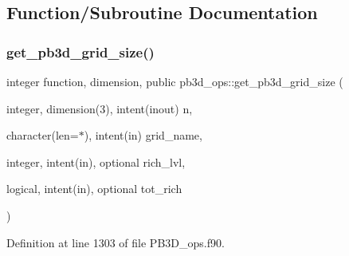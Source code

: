 \subsection{Function/\+Subroutine Documentation}
\mbox{\label{namespacepb3d__ops_a0bd4c4c24d7cbd1494b31ea993946433}} 
\subsubsection{\texorpdfstring{get\+\_\+pb3d\+\_\+grid\+\_\+size()}{get\_pb3d\_grid\_size()}}
{\footnotesize\ttfamily integer function, dimension, public pb3d\+\_\+ops\+::get\+\_\+pb3d\+\_\+grid\+\_\+size (\begin{DoxyParamCaption}\item[{integer, dimension(3), intent(inout)}]{n,  }\item[{character(len=$\ast$), intent(in)}]{grid\+\_\+name,  }\item[{integer, intent(in), optional}]{rich\+\_\+lvl,  }\item[{logical, intent(in), optional}]{tot\+\_\+rich }\end{DoxyParamCaption})}



Definition at line 1303 of file P\+B3\+D\+\_\+ops.\+f90.

